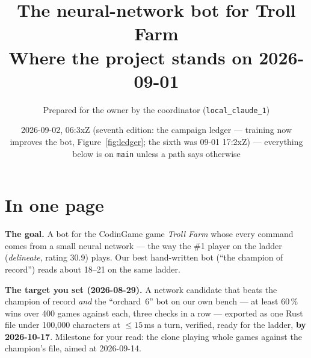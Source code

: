 \documentclass[11pt,a4paper]{article}
\title{The neural-network bot for Troll Farm\\[2pt]\large Where the project stands on 2026-09-01}
\author{Prepared for the owner by the coordinator (\texttt{local\_claude\_1})}
\date{2026-09-02, 06:3xZ (seventh edition: the campaign ledger --- training now improves the bot, Figure~\ref{fig:ledger}; the sixth was 09-01 17:2xZ) --- everything below is on \texttt{main} unless a path says otherwise}
\begin{document}
\maketitle

\section*{In one page}

\textbf{The goal.} A bot for the CodinGame game \emph{Troll Farm} whose every command comes from a small neural network --- the way the \#1 player on the ladder (\emph{delineate}, rating 30.9) plays. Our best hand-written bot (``the champion of record'') reads about 18--21 on the same ladder.

\textbf{The target you set (2026-08-29).} A network candidate that beats the champion of record \emph{and} the ``orchard~6'' bot on our own bench --- at least 60\,\% wins over 400 games against each, three checks in a row --- exported as one Rust file under 100,000 characters at $\le 15$\,ms a turn, verified, ready for the ladder, \textbf{by 2026-10-17}. Milestone for your read: the clone playing whole games against the champion's file, aimed at 2026-09-14.
\end{document}
